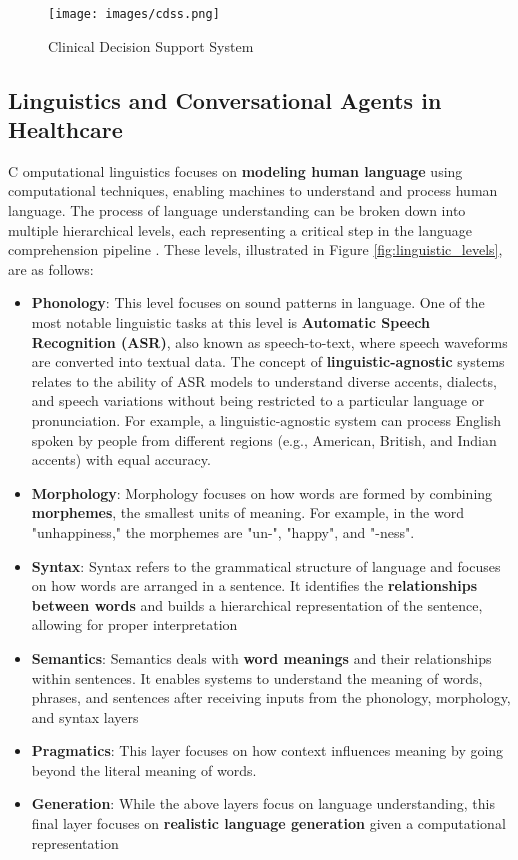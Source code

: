 \begin{figure}[h]
    \centering
    \texttt{[image: images/cdss.png]}
    \caption{Clinical Decision Support System}
    \label{fig:abdominal_regions}
\end{figure}

\subsection{Linguistics and Conversational Agents in Healthcare}
\lettrine{C}{ }omputational linguistics focuses on \textcolor{TUMRed}{\textbf{modeling human language}} using computational techniques, enabling machines to understand and process human language. The process of language understanding can be broken down into multiple hierarchical levels, each representing a critical step in the language comprehension pipeline \cite{cohen2022intelligent}. These levels, illustrated in Figure \ref{fig:linguistic_levels}, are as follows:
\begin{itemize}
    \item \textcolor{TUMRed}{\textbf{Phonology}}: This level focuses on sound patterns in language. One of the most notable linguistic tasks at this level is \textcolor{TUMRed}{\textbf{Automatic Speech Recognition (ASR)}}, also known as speech-to-text, where speech waveforms are converted into textual data. The concept of \textcolor{TUMRed}{\textbf{linguistic-agnostic}} systems relates to the ability of ASR models to understand diverse accents, dialects, and speech variations without being restricted to a particular language or pronunciation. For example, a linguistic-agnostic system can process English spoken by people from different regions (e.g., American, British, and Indian accents) with equal accuracy.
    \item \textcolor{TUMRed}{\textbf{Morphology}}: Morphology focuses on how words are formed by combining \textcolor{TUMRed}{\textbf{morphemes}}, the smallest units of meaning. For example, in the word "unhappiness," the morphemes are "un-", "happy", and "-ness".
    \item \textcolor{TUMRed}{\textbf{Syntax}}: Syntax refers to the grammatical structure of language and focuses on how words are arranged in a sentence. It identifies the \textcolor{TUMRed}{\textbf{relationships between words}} and builds a hierarchical representation of the sentence, allowing for proper interpretation
    \item \textcolor{TUMRed}{\textbf{Semantics}}: Semantics deals with \textcolor{TUMRed}{\textbf{word meanings}} and their relationships within sentences. It enables systems to understand the meaning of words, phrases, and sentences after receiving inputs from the phonology, morphology, and syntax layers
    \item \textcolor{TUMRed}{\textbf{Pragmatics}}: This layer focuses on how context influences meaning by going beyond the literal meaning of words. 
    \item \textcolor{TUMRed}{\textbf{Generation}}: While the above layers focus on language understanding, this final layer focuses on \textcolor{TUMRed}{\textbf{realistic language generation}} given a computational representation 
\end{itemize}

